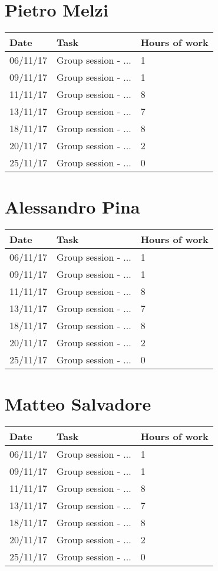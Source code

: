 \section{Pietro Melzi}
\begin{table}[H]
	\begin{tabular}{ p{2cm} p{8cm} p{3cm}}
	Date & Task & Hours of work\\
	\hline
	06/11/17 & Group session - ... & 1 \\
	09/11/17 & Group session - ... & 1 \\
	11/11/17 & Group session - ... & 8 \\
	13/11/17 & Group session - ... & 7 \\
	18/11/17 & Group session - ... & 8 \\
	20/11/17 & Group session - ... & 2 \\
	25/11/17 & Group session - ... & 0 \\
	\end{tabular}
\end{table}

\section{Alessandro Pina}
\begin{table}[H]
	\begin{tabular}{ p{2cm} p{8cm} p{3cm}}
	Date & Task & Hours of work\\
	\hline
	06/11/17 & Group session - ... & 1 \\
	09/11/17 & Group session - ... & 1 \\
	11/11/17 & Group session - ... & 8 \\
	13/11/17 & Group session - ... & 7 \\
	18/11/17 & Group session - ... & 8 \\
	20/11/17 & Group session - ... & 2 \\
	25/11/17 & Group session - ... & 0 \\
	\end{tabular}
\end{table}

\section{Matteo Salvadore}
\begin{table}[H]
	\begin{tabular}{ p{2cm} p{8cm} p{3cm}}
	Date & Task & Hours of work\\
	\hline
	06/11/17 & Group session - ... & 1 \\
	09/11/17 & Group session - ... & 1 \\
	11/11/17 & Group session - ... & 8 \\
	13/11/17 & Group session - ... & 7 \\
	18/11/17 & Group session - ... & 8 \\
	20/11/17 & Group session - ... & 2 \\
	25/11/17 & Group session - ... & 0 \\
	\end{tabular}
\end{table}